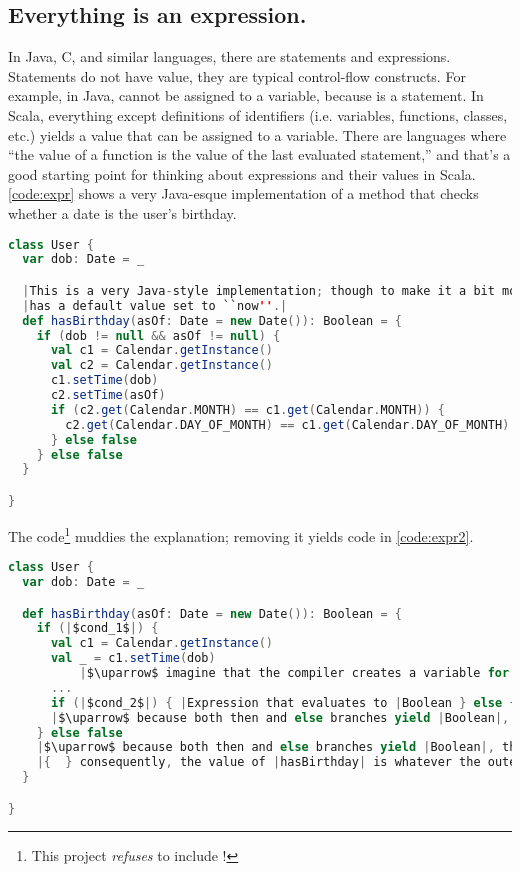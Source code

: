 \documentclass[10 pt]{article}
\begin{document}
\subsection{Everything is an expression.} 
In Java, C, and similar languages, there are statements and expressions. Statements do not have value, they are typical control-flow constructs. For example, in Java,  cannot be assigned to a variable, because  is a statement. In Scala, everything except definitions of identifiers (i.e. variables, functions, classes, etc.) yields a value that can be assigned to a variable. There are languages where ``the value of a function is the value of the last evaluated statement,'' and that's a good starting point for thinking about expressions and their values in Scala. \autoref{code:expr} shows a very Java-esque implementation of a method that checks whether a date is the user's birthday. 

\begin{lstlisting}[caption={Expressions}, label={code:expr}, language=Scala, escapechar=|]
class User {
  var dob: Date = _

  |This is a very Java-style implementation; though to make it a bit more interesting, the |asOf| parameter|
  |has a default value set to ``now''.|
  def hasBirthday(asOf: Date = new Date()): Boolean = {
    if (dob != null && asOf != null) {
      val c1 = Calendar.getInstance()
      val c2 = Calendar.getInstance()
      c1.setTime(dob)
      c2.setTime(asOf)
      if (c2.get(Calendar.MONTH) == c1.get(Calendar.MONTH)) {
        c2.get(Calendar.DAY_OF_MONTH) == c1.get(Calendar.DAY_OF_MONTH)
      } else false
    } else false
  }

}
\end{lstlisting}

The  code\footnote{This project \emph{refuses} to include !} muddies the explanation; removing it yields code in \autoref{code:expr2}.

\begin{lstlisting}[caption={Expressions}, label={code:expr2}, language=Scala, escapechar=|]
class User {
  var dob: Date = _

  def hasBirthday(asOf: Date = new Date()): Boolean = {
    if (|$cond_1$|) {
      val c1 = Calendar.getInstance()
      val _ = c1.setTime(dob)
          |$\uparrow$ imagine that the compiler creates a variable for every expression that isn't the last one in a block.|
      ...
      if (|$cond_2$|) { |Expression that evaluates to |Boolean } else { |Expression that evaluates to |Boolean }
      |$\uparrow$ because both then and else branches yield |Boolean|, the value of the entire |if| expression is |Boolean|.|
    } else false
    |$\uparrow$ because both then and else branches yield |Boolean|, the value of the entire |if| expression is |Boolean|.|
    |{  } consequently, the value of |hasBirthday| is whatever the outer |if| expression evaluates to.|
  }

}
\end{lstlisting}
\end{document}

